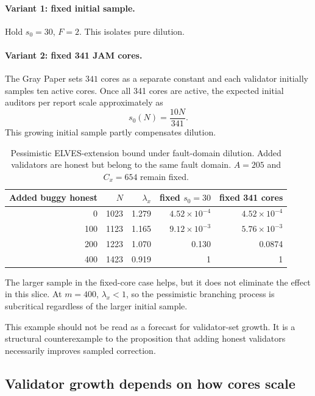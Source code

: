 \paragraph{Variant 1: fixed initial sample.}
Hold \(s_0=30\), \(F=2\). This isolates pure dilution.

\paragraph{Variant 2: fixed 341 JAM cores.}
The Gray Paper sets \(341\) cores as a separate constant and each validator initially samples ten active cores. Once all 341 cores are active, the expected initial auditors per report scale approximately as
\[
 s_0(N)=\frac{10N}{341}.
\]
This growing initial sample partly compensates dilution.

\begin{table}[htbp]
\centering
\small
\caption{Pessimistic ELVES-extension bound under fault-domain dilution. Added validators are honest but belong to the same fault domain. \(A=205\) and \(C_x=654\) remain fixed.}
\label{tab:dilution}
\begin{tabular}{rrrrr}
\toprule
Added buggy honest & \(N\) & \(\lambda_x\) & fixed \(s_0=30\) & fixed 341 cores \\
\midrule
0   & 1023 & 1.279 & \(4.52\times10^{-4}\) & \(4.52\times10^{-4}\) \\
100 & 1123 & 1.165 & \(9.12\times10^{-3}\) & \(5.76\times10^{-3}\) \\
200 & 1223 & 1.070 & 0.130 & 0.0874 \\
400 & 1423 & 0.919 & 1 & 1 \\
\bottomrule
\end{tabular}
\end{table}

The larger sample in the fixed-core case helps, but it does not eliminate the effect in this slice. At \(m=400\), \(\lambda_x<1\), so the pessimistic branching process is subcritical regardless of the larger initial sample.

This example should not be read as a forecast for validator-set growth. It is a structural counterexample to the proposition that adding honest validators necessarily improves sampled correction.

\subsection{Validator growth depends on how cores scale}


